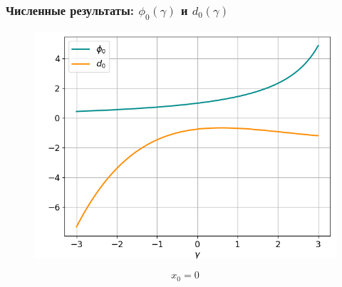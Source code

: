 \documentclass[fullscreen=true, unicode, bookmarks=false]{beamer}
\begin{document}
\begin{frame}
\frametitle{ Численные результаты: $ \phi_0(\gamma) $ и $ d_0(\gamma) $ }

\begin{figure} 
\includegraphics[scale=0.55]{divergent_phi0d0_0.png}  
\end{figure}

$$ x_0 = 0 $$

\end{frame}
\end{document}
